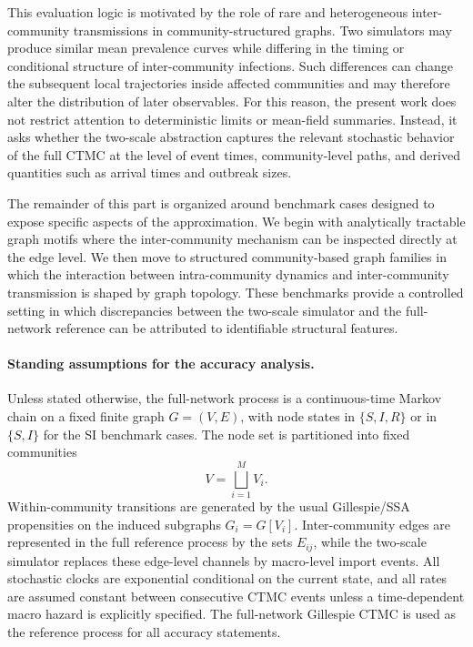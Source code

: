 \documentclass[12pt]{article}
\begin{document}
This evaluation logic is motivated by the role of rare and heterogeneous inter-community transmissions in community-structured graphs. Two simulators may produce similar mean prevalence curves while differing in the timing or conditional structure of inter-community infections. Such differences can change the subsequent local trajectories inside affected communities and may therefore alter the distribution of later observables. For this reason, the present work does not restrict attention to deterministic limits or mean-field summaries. Instead, it asks whether the two-scale abstraction captures the relevant stochastic behavior of the full CTMC at the level of event times, community-level paths, and derived quantities such as arrival times and outbreak sizes.

The remainder of this part is organized around benchmark cases designed to expose specific aspects of the approximation. We begin with analytically tractable graph motifs where the inter-community mechanism can be inspected directly at the edge level. We then move to structured community-based graph families in which the interaction between intra-community dynamics and inter-community transmission is shaped by graph topology. These benchmarks provide a controlled setting in which discrepancies between the two-scale simulator and the full-network reference can be attributed to identifiable structural features.

\paragraph{Standing assumptions for the accuracy analysis.}
Unless stated otherwise, the full-network process is a continuous-time Markov chain on a fixed finite graph \(G=(V,E)\), with node states in \(\{S,I,R\}\) or in \(\{S,I\}\) for the SI benchmark cases. 
The node set is partitioned into fixed communities
\[
V=\bigsqcup_{i=1}^{M}V_i.
\]
Within-community transitions are generated by the usual Gillespie/SSA propensities on the induced subgraphs \(G_i=G[V_i]\). 
Inter-community edges are represented in the full reference process by the sets \(E_{ij}\), while the two-scale simulator replaces these edge-level channels by macro-level import events. 
All stochastic clocks are exponential conditional on the current state, and all rates are assumed constant between consecutive CTMC events unless a time-dependent macro hazard is explicitly specified. 
The full-network Gillespie CTMC is used as the reference process for all accuracy statements.
\end{document}
